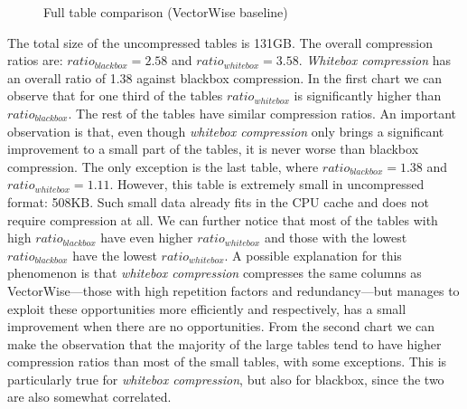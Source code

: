 \begin{figure}[h]
  \centering
  \caption{Full table comparison (VectorWise baseline)}
  \label{fig:eval:results:vectorwise:total}
\end{figure}

The total size of the uncompressed tables is 131GB. The overall compression ratios are:  \(ratio_{blackbox} = 2.58\) and \(ratio_{whitebox} = 3.58\). \textit{Whitebox compression} has an overall ratio of 1.38 against blackbox compression. In the first chart we can observe that for one third of the tables \(ratio_{whitebox}\) is significantly higher than \(ratio_{blackbox}\). The rest of the tables have similar compression ratios. 
An important observation is that, even though \textit{whitebox compression} only brings a significant improvement to a small part of the tables, it is never worse than blackbox compression. The only exception is the last table, where \(ratio_{blackbox} = 1.38\) and \(ratio_{whitebox} = 1.11\). However, this table is extremely small in uncompressed format: 508KB. Such small data already fits in the CPU cache and does not require compression at all. We can further notice that most of the tables with high \(ratio_{blackbox}\) have even higher \(ratio_{whitebox}\) and those with the lowest \(ratio_{blackbox}\) have the lowest \(ratio_{whitebox}\). A possible explanation for this phenomenon is that \textit{whitebox compression} compresses the same columns as VectorWise---those with high repetition factors and redundancy---but manages to exploit these opportunities more efficiently and respectively, has a small improvement when there are no opportunities. From the second chart we can make the observation that the majority of the large tables tend to have higher compression ratios than most of the small tables, with some exceptions. This is particularly true for \textit{whitebox compression}, but also for blackbox, since the two are also somewhat correlated.

